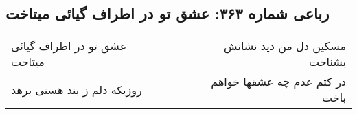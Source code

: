 \begin{center}
\section*{رباعی شماره ۳۶۳: عشق تو در اطراف گیائی میتاخت}
\label{sec:0363}
\begin{longtable}{l p{0.5cm} r}
عشق تو در اطراف گیائی میتاخت
&&
مسکین دل من دید نشانش بشناخت
\\
روزیکه دلم ز بند هستی برهد
&&
در کتم عدم چه عشقها خواهم باخت
\\
\end{longtable}
\end{center}
